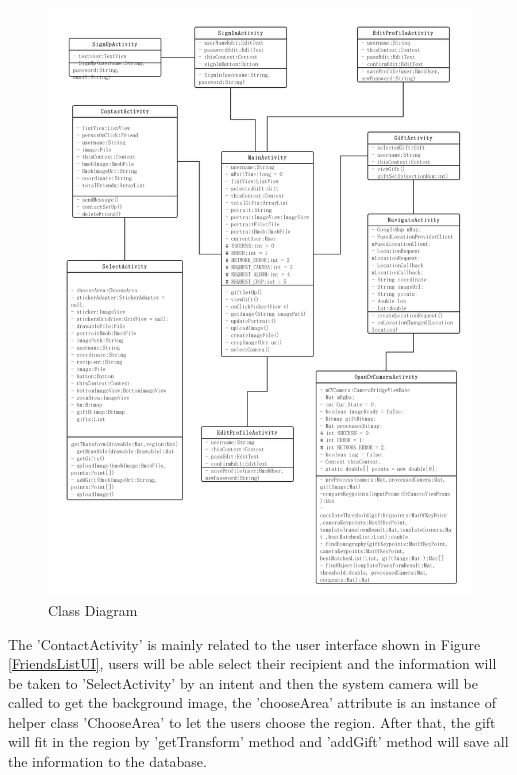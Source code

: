 \begin{figure}[H]
\centering
\includegraphics[width=.8\textwidth]{section03/assets/ClassDiagram.png}
\caption[Short Caption 2]{\label{ClassDiagram}Class Diagram}
\end{figure}
\par The 'ContactActivity' is mainly related to the user interface shown in Figure \ref{FriendsListUI}, users will be able select their recipient and the information will be taken to 'SelectActivity' by an intent and then the system camera will be called to get the background image, the 'chooseArea' attribute is an instance of helper class 'ChooseArea' to let the users choose the region. After that, the gift will fit in the region by 'getTransform' method and 'addGift' method will save all the information to the database.
